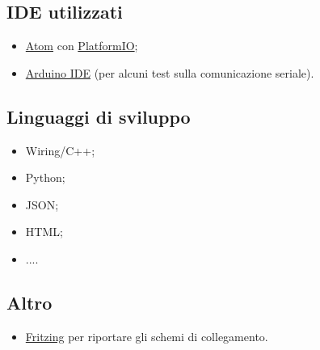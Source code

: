 \subsection{IDE utilizzati}
\begin{itemize}
	\item \href{https://atom.io/}{Atom} con \href{ http://platformio.org/}{PlatformIO};
	\item \href{https://www.arduino.cc/en/Main/Software}{Arduino IDE} (per alcuni test sulla comunicazione seriale).
\end{itemize}

\subsection{Linguaggi di sviluppo}
\begin{itemize}
	\item Wiring/C++;
	\item Python;
	\item JSON;
	\item HTML;
	\item ....
\end{itemize}

\subsection{Altro}
\begin{itemize}
	\item \href{http://fritzing.org}{Fritzing} per riportare gli schemi di collegamento.
\end{itemize}